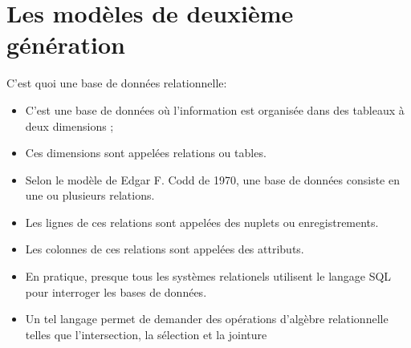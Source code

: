 \documentclass{beamer}
\begin{document}
    \section{Les mod\`eles de deuxi\`eme g\'en\'eration}
\begin{frame}{C'est quoi une base de donn\'ees relationnelle:}
    \begin{itemize}
        \item C'est une  base de donn\'ees o\`u l'information est organis\'ee dans des tableaux \`a deux dimensions  ;
        \item Ces dimensions sont appel\'ees relations ou tables.
        \item Selon le mod\`ele de Edgar F. Codd de 1970, une base de donn\'ees consiste en une  ou plusieurs relations.
        \item Les lignes de ces relations sont appel\'ees des nuplets ou enregistrements.
        \item Les colonnes de ces relations sont appel\'ees des attributs.
        \item En pratique, presque tous les  syst\`emes relationels utilisent le langage SQL pour interroger les bases de donn\'ees.
        \item Un tel langage permet  de demander des op\'erations d'alg\`ebre relationnelle telles que l'intersection, la s\'election et la jointure
        \end{itemize}
        \end{frame}
       
\end{document}
